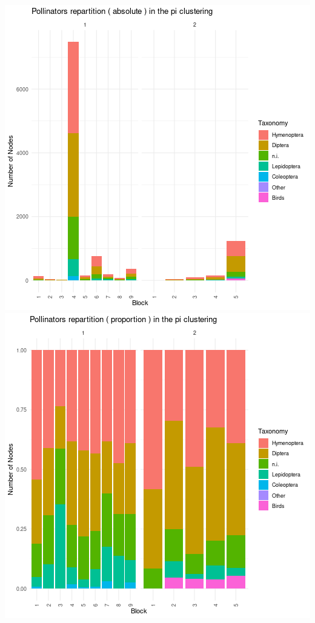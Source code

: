 \includegraphics{./img/ff78b3a602b38666524674a6e38d94ee26963376.png}\includegraphics{./img/57ebffb0873b5079093d6f7d474c00142ee5e2ab.png}

